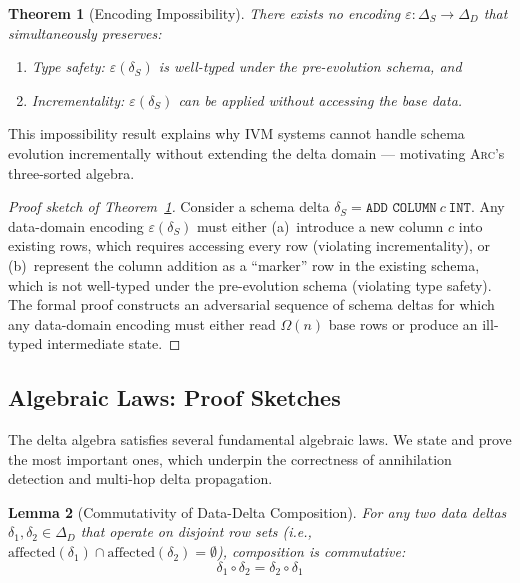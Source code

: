 \documentclass[sigplan,screen,nonacm]{acmart}
\newcommand{\arc}{\textsc{Arc}\xspace}
\newcommand{\DeltaS}{\Delta_{\!S}}
\newcommand{\DeltaD}{\Delta_{\!D}}
\newcommand{\compose}{\mathbin{\circ}}
\newtheorem{theorem}{Theorem}
\newtheorem{lemma}[theorem]{Lemma}
\begin{document}
\begin{theorem}[Encoding Impossibility]\label{thm:impossibility}
There exists no encoding $\varepsilon\colon \DeltaS \to \DeltaD$ that
simultaneously preserves:
\begin{enumerate}
\item \emph{Type safety}: $\varepsilon(\delta_S)$ is well-typed under the
  pre-evolution schema, and
\item \emph{Incrementality}: $\varepsilon(\delta_S)$ can be applied without
  accessing the base data.
\end{enumerate}
\end{theorem}

This impossibility result explains why IVM systems cannot handle schema
evolution incrementally without extending the delta domain --- motivating
\arc's three-sorted algebra.

\begin{proof}[Proof sketch of Theorem~\ref{thm:impossibility}]
Consider a schema delta $\delta_S = \texttt{ADD COLUMN}~c~\texttt{INT}$.
Any data-domain encoding $\varepsilon(\delta_S)$ must either (a)~introduce
a new column $c$ into existing rows, which requires accessing every row
(violating incrementality), or (b)~represent the column addition as a
``marker'' row in the existing schema, which is not well-typed under the
pre-evolution schema (violating type safety).  The formal proof constructs
an adversarial sequence of schema deltas for which any data-domain encoding
must either read $\Omega(n)$ base rows or produce an ill-typed intermediate
state.
\end{proof}

\subsection{Algebraic Laws: Proof Sketches}\label{sec:proofs}

The delta algebra satisfies several fundamental algebraic laws.  We state
and prove the most important ones, which underpin the correctness of
annihilation detection and multi-hop delta propagation.

\begin{lemma}[Commutativity of Data-Delta Composition]\label{lem:commut}
For any two data deltas $\delta_1, \delta_2 \in \DeltaD$ that operate on
disjoint row sets (i.e., $\mathrm{affected}(\delta_1) \cap
\mathrm{affected}(\delta_2) = \emptyset$), composition is commutative:
\[
  \delta_1 \compose \delta_2 = \delta_2 \compose \delta_1
\]
\end{lemma}
\end{document}
